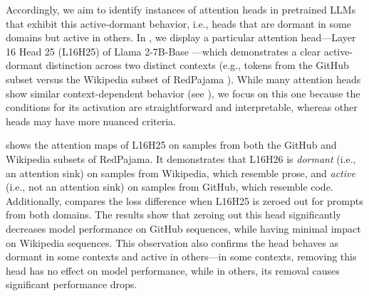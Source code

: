 Accordingly, we aim to identify instances of attention heads in pretrained LLMs that exhibit this active-dormant behavior, i.e., heads that are dormant in some domains but active in others. In , we display a particular attention head---Layer 16 Head 25 (L16H25) of Llama 2-7B-Base \citep{touvron2023llama}---which demonstrates a clear active-dormant distinction across two distinct contexts (e.g., tokens from the GitHub subset versus the Wikipedia subset of RedPajama \citep{together2023redpajama}). While many attention heads show similar context-dependent behavior (see ), we focus on this one because the conditions for its activation are straightforward and interpretable, whereas other heads may have more nuanced criteria. 

 shows the attention maps of L16H25 on samples from both the GitHub and Wikipedia subsets of RedPajama. It demonstrates that L16H26 is \textit{dormant} (i.e., an attention sink) on samples from Wikipedia, which resemble prose, and \textit{active} (i.e., not an attention sink) on samples from GitHub, which resemble code. Additionally,  compares the loss difference when L16H25 is zeroed out for prompts from both domains. The results show that zeroing out this head significantly decreases model performance on GitHub sequences, while having minimal impact on Wikipedia sequences. This observation also confirms the head behaves as dormant in some contexts and active in others---in some contexts, removing this head has no effect on model performance, while in others, its removal causes significant performance drops.



